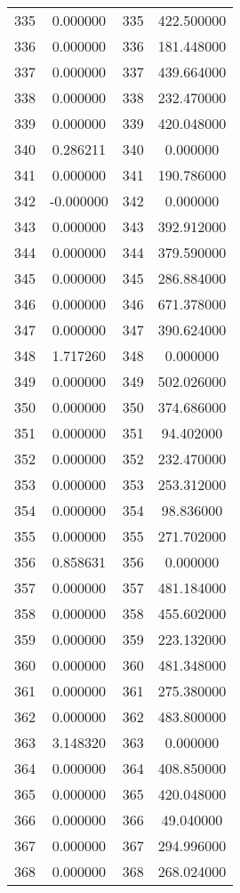 \documentclass[12pt]{article}
\begin{document}
\begin{longtable}{@{}cccc@{}}
335 & 0.000000 & 335 & 422.500000 \\
336 & 0.000000 & 336 & 181.448000 \\
337 & 0.000000 & 337 & 439.664000 \\
338 & 0.000000 & 338 & 232.470000 \\
339 & 0.000000 & 339 & 420.048000 \\
340 & 0.286211 & 340 & 0.000000 \\
341 & 0.000000 & 341 & 190.786000 \\
342 & -0.000000 & 342 & 0.000000 \\
343 & 0.000000 & 343 & 392.912000 \\
344 & 0.000000 & 344 & 379.590000 \\
345 & 0.000000 & 345 & 286.884000 \\
346 & 0.000000 & 346 & 671.378000 \\
347 & 0.000000 & 347 & 390.624000 \\
348 & 1.717260 & 348 & 0.000000 \\
349 & 0.000000 & 349 & 502.026000 \\
350 & 0.000000 & 350 & 374.686000 \\
351 & 0.000000 & 351 & 94.402000 \\
352 & 0.000000 & 352 & 232.470000 \\
353 & 0.000000 & 353 & 253.312000 \\
354 & 0.000000 & 354 & 98.836000 \\
355 & 0.000000 & 355 & 271.702000 \\
356 & 0.858631 & 356 & 0.000000 \\
357 & 0.000000 & 357 & 481.184000 \\
358 & 0.000000 & 358 & 455.602000 \\
359 & 0.000000 & 359 & 223.132000 \\
360 & 0.000000 & 360 & 481.348000 \\
361 & 0.000000 & 361 & 275.380000 \\
362 & 0.000000 & 362 & 483.800000 \\
363 & 3.148320 & 363 & 0.000000 \\
364 & 0.000000 & 364 & 408.850000 \\
365 & 0.000000 & 365 & 420.048000 \\
366 & 0.000000 & 366 & 49.040000 \\
367 & 0.000000 & 367 & 294.996000 \\
368 & 0.000000 & 368 & 268.024000 \\

\end{longtable}
\end{document}
